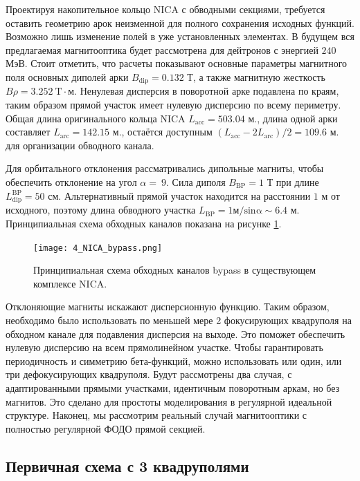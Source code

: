 \par Проектируя накопительное кольцо NICA с обводными секциями, требуется оставить геометрию арок неизменной для полного сохранения исходных функций. Возможно лишь изменение полей в уже установленных элементах. В будущем вся предлагаемая магнитооптика будет рассмотрена для дейтронов с энергией $240$ МэВ. Стоит отметить, что расчеты показывают основные параметры магнитного поля основных диполей арки $B_{\textrm{dip}}=0.132$ Т, а также магнитную жесткость $B\rho=3.252 \ \textrm{T} \cdot$м. Ненулевая дисперсия в поворотной арке подавлена по краям, таким образом прямой участок имеет нулевую дисперсию по всему периметру. Общая длина оригинального кольца NICA $L_{\textrm{acc}}=503.04$ м., длина одной арки составляет $L_{\textrm{arc}}=142.15$ м., остаётся доступным $\left(L_{\textrm{acc}}-2L_{\textrm{arc}}\right)/2=109.6$ м. для организации обводного канала.

\par Для орбитального отклонения рассматривались дипольные магниты, чтобы обеспечить отклонение на угол $\alpha=\ 9$. Сила диполя $B_{\textrm{BP}}=1$ Т при длине $L_{\textrm{dip}}^{\textrm{BP}}=50$ см. Альтернативный прямой участок находится на расстоянии $1$ м от исходного, поэтому длина обводного участка $L_{\textrm{BP}}=1\mathrm{м/sin\alpha}\sim6.4$ м. Принципиальная схема обходных каналов показана на рисунке \ref{fig:4_NICA_bypass}.

\begin{figure}[!h]
  \centering
   \texttt{[image: 4\_NICA\_bypass.png]}
   \caption{Принципиальная схема обходных каналов bypass в существующем комплексе NICA.}
   \label{fig:4_NICA_bypass}
\end{figure}

\par Отклоняющие магниты искажают дисперсионную функцию. Таким образом, необходимо было использовать по меньшей мере 2 фокусирующих квадруполя на обходном канале для подавления дисперсия на выходе. Это поможет обеспечить нулевую дисперсию на всем прямолинейном участке. Чтобы гарантировать периодичность и симметрию бета-функций, можно использовать или один, или три дефокусирующих квадруполя. Будут рассмотрены два случая, с адаптированными прямыми участками, идентичным поворотным аркам, но без магнитов. Это сделано для простоты моделирования в регулярной идеальной структуре. Наконец, мы рассмотрим реальный случай магнитооптики с полностью регулярной ФОДО прямой секцией.

	\subsection{Первичная схема с 3 квадруполями}\label{sec:EDM/Wien_filter/ByPass/3quad}

